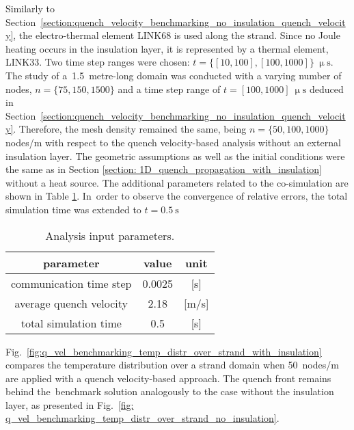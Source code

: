 
Similarly to Section~\ref{section:quench_velocity_benchmarking_no_insulation_quench_velocity}, the electro-thermal element LINK68 is used along the strand. Since no Joule heating occurs in the insulation layer, it is represented by a thermal element, LINK33. Two time step ranges were chosen: $t=\{[10, 100], [100, 1000]\}~\upmu \text{s}$. The study of a~1.5~metre-long domain was conducted with a varying number of nodes, $n=\{75, 150, 1500\}$ and a time step range of $t=[100, 1000]~\upmu \text{s}$ deduced in Section~\ref{section:quench_velocity_benchmarking_no_insulation_quench_velocity}. Therefore, the mesh density remained the same, being $n=\{50, 100, 1000\}$ nodes/m  with respect to the quench velocity-based analysis without an external insulation layer. The geometric assumptions as well as the initial conditions were the same as in Section \ref{section: 1D_quench_propagation_with_insulation} without a heat source. The additional parameters related to the co-simulation are shown in Table \ref{table:1d_qv_benchmarking_geometry__with_insulation_parameters_quench_velocity}. In~order to observe the convergence of relative errors, the total simulation time was extended to $t=0.5~\text{s}$

\begin{table}[H]
    \caption{Analysis input parameters.} 
    \vspace{-1.em} 
    \fontsize{10}{10}
    \selectfont 
    \renewcommand{\arraystretch}{1.5}
    \begin{center}
        \begin{tabular}{ ccc }  
        \hline
        parameter & value & unit \\
        \hline
        communication time step & 0.0025 & [s] \\
        average quench velocity & 2.18 & [m/s] \\
        total simulation time & 0.5 & [s] \\
        \hline 
        \end{tabular}
    \end{center}  
    \label{table:1d_qv_benchmarking_geometry__with_insulation_parameters_quench_velocity} 
\end{table}

Fig.~\ref{fig:q_vel_benchmarking_temp_distr_over_strand_with_insulation} compares the temperature distribution over a strand domain when 50~nodes/m are applied with a quench velocity-based approach. The quench front remains behind the~benchmark solution analogously to the case without the insulation layer, as presented in Fig.~\ref{fig: q_vel_benchmarking_temp_distr_over_strand_no_insulation}.

